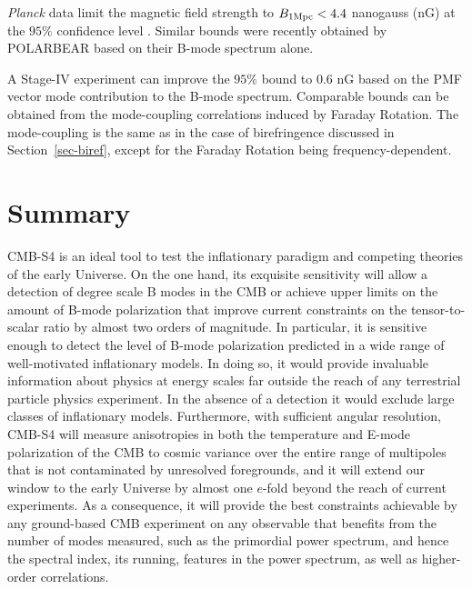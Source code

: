 {\it Planck\/} data limit the magnetic field strength to $B_{1 {\rm Mpc}}<4.4$ nanogauss (nG) at the $95\%$ confidence level \cite{Ade:2015cva}. Similar bounds were recently obtained by POLARBEAR \cite{Ade:2015cao} based on their B-mode spectrum alone.

A Stage-IV experiment can improve the $95\%$ bound to 0.6 nG based on the PMF vector mode contribution to the B-mode spectrum. Comparable bounds can be obtained from the mode-coupling correlations induced by Faraday Rotation. The mode-coupling is the same as in the case of birefringence discussed in Section~\ref{sec-biref}, except for the Faraday Rotation being frequency-dependent.

 
\section{Summary}
CMB-S4 is an ideal tool to test the inflationary paradigm and competing theories of the early Universe. On the one hand, its exquisite sensitivity will allow a detection of degree scale B modes in the CMB or achieve upper limits on the amount of B-mode polarization that improve current constraints on the tensor-to-scalar ratio by almost two orders of magnitude. In particular, it is sensitive enough to detect the level of B-mode polarization predicted in a wide range of well-motivated inflationary models. In doing so, it would provide invaluable information about physics at energy scales far outside the reach of any terrestrial particle physics experiment. In the absence of a detection it would exclude large classes of inflationary models. Furthermore, with sufficient angular resolution, CMB-S4 will measure anisotropies in both the temperature and E-mode polarization of the CMB to cosmic variance over the entire range of multipoles that is not contaminated by unresolved foregrounds, and it will extend our window to the early Universe by almost one $e$-fold beyond the reach of current experiments. As a consequence, it will provide the best constraints achievable by any ground-based CMB experiment on any observable that benefits from the number of modes measured, such as the primordial power spectrum, and hence the spectral index, its running, features in the power spectrum, as well as higher-order correlations.


 
